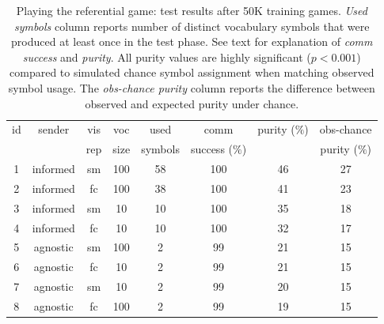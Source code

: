 \begin{table}
\centering
\small
\begin{tabular}{c|c|c|c|c|c|c|c}
id & sender   &vis   &voc &used     &comm    &      purity ($\%$)   &obs-chance\\
 	&	& rep & size& symbols & success ($\%$) &  & purity ($\%$) \\\hline
1&informed&sm     &100       &58          &100                &46           &27 \\
2&informed&fc        &100       &38          &100                &41           &23 \\
3&informed&sm     &10        &10          &100                &35           &18 \\
4&informed&fc        &10        &10          &100                &32           &17 \\
5&agnostic&sm     &100       &2           &99                 &21           &15 \\
6&agnostic&fc        &10        &2           &99                 &21           &15 \\
7&agnostic&sm     &10        &2           &99                 &20           &15 \\
8&agnostic&fc        &100       &2           &99                 &19           &15 \\
\end{tabular}

\caption{Playing the referential game: test results after 50K training games. \emph{Used symbols} column reports number of distinct vocabulary symbols that were produced at least once in the test phase. See text for explanation of \emph{comm success} and \emph{purity}. All purity values are highly significant ($p<0.001$) compared to simulated chance symbol assignment when matching observed symbol usage. %
  The \emph{obs-chance purity} column reports the difference between observed and expected purity under chance.}
  \label{tab:exp1_table}
\end{table}

